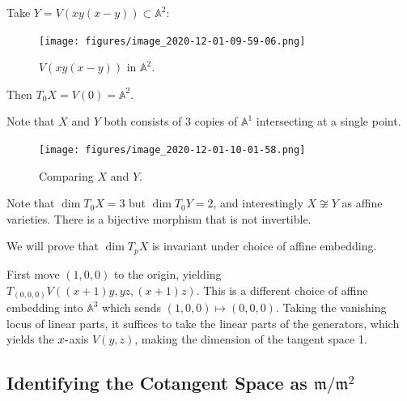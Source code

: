 \begin{example}[?]

Take \(Y = V(xy(x-y)) \subset {\mathbb{A}}^2\):

\begin{figure}
\centering
\texttt{[image: figures/image\_2020-12-01-09-59-06.png]}
\caption{\(V(xy(x-y))\) in \({\mathbb{A}}^2\).}
\end{figure}

Then \(T_0 X = V(0) = {\mathbb{A}}^2\).

\end{example}

\begin{remark}

Note that \(X\) and \(Y\) both consists of 3 copies of
\({\mathbb{A}}^1\) intersecting at a single point.

\begin{figure}
\centering
\texttt{[image: figures/image\_2020-12-01-10-01-58.png]}
\caption{Comparing \(X\) and \(Y\).}
\end{figure}

Note that \(\dim T_0 X = 3\) but \(\dim T_0 Y = 2\), and interestingly
\(X\not\cong Y\) as affine varieties. There is a bijective morphism that
is not invertible.

\end{remark}

\begin{remark}

We will prove that \(\dim T_p X\) is invariant under choice of affine
embedding.

\end{remark}

\begin{example}

First move \((1,0,0)\) to the origin, yielding
\(T_{(0,0,0)} V((x+1)y, yz, (x+1) z)\). This is a different choice of
affine embedding into \({\mathbb{A}}^3\) which sends
\((1,0,0) \mapsto (0,0,0)\). Taking the vanishing locus of linear parts,
it suffices to take the linear parts of the generators, which yields the
\(x{\hbox{-}}\)axis \(V(y, z)\), making the dimension of the tangent
space 1.

\end{example}

\hypertarget{identifying-the-cotangent-space-as-mathfrakmmathfrakm2}{%
\subsection{\texorpdfstring{Identifying the Cotangent Space as
\(\mathfrak{m}/\mathfrak{m}^2\)}{Identifying the Cotangent Space as \textbackslash mathfrak\{m\}/\textbackslash mathfrak\{m\}\^{}2}}\label{identifying-the-cotangent-space-as-mathfrakmmathfrakm2}}

